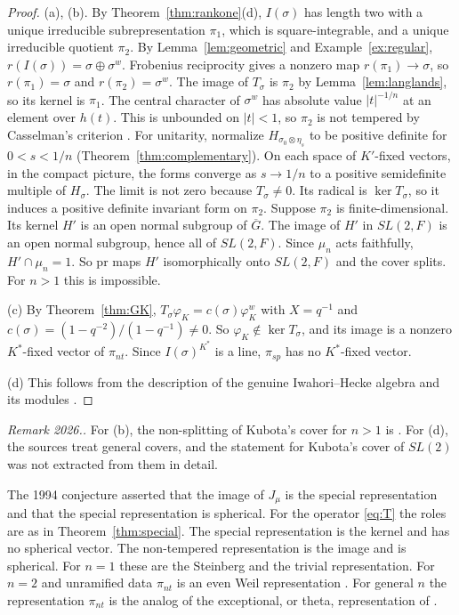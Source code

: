 \documentclass[12pt,letterpaper]{article}
\numberwithin{equation}{section}
\theoremstyle{definition}
\newcounter{rmk}
\newcommand{\unverified}[1]{\refstepcounter{rmk}\par\smallskip\noindent\textit{Remark 2026.\arabic{rmk}.} #1\par\smallskip}
\newcommand{\bG}{\overline{G}}
\newcommand{\pr}{\mathrm{pr}}
\begin{document}
\begin{proof}
(a), (b).  By Theorem~\ref{thm:rankone}(d), $I(\sigma)$ has length two with a unique
irreducible subrepresentation $\pi_1$, which is square-integrable, and a unique irreducible
quotient $\pi_2$.  By Lemma~\ref{lem:geometric} and Example~\ref{ex:regular},
$r(I(\sigma))=\sigma\oplus\sigma^w$.  Frobenius reciprocity gives a nonzero map
$r(\pi_1)\to\sigma$, so $r(\pi_1)=\sigma$ and $r(\pi_2)=\sigma^w$.  The image of $T_\sigma$ is
$\pi_2$ by Lemma~\ref{lem:langlands}, so its kernel is $\pi_1$.  The central character of
$\sigma^w$ has absolute value $|t|^{-1/n}$ at an element over $h(t)$.  This is unbounded on
$|t|<1$, so $\pi_2$ is not tempered by Casselman's criterion \cite{BJ13}.  For
unitarity, normalize $H_{\sigma_0\otimes\eta_s}$ to be positive definite for $0<s<1/n$
(Theorem~\ref{thm:complementary}).  On each space of $K'$-fixed vectors, in the compact
picture, the forms converge as $s\to1/n$ to a positive semidefinite multiple of
$H_\sigma$.  The limit is not zero because $T_\sigma\ne0$.  Its radical is $\ker T_\sigma$, so
it induces a positive definite invariant form on $\pi_2$.  Suppose $\pi_2$ is
finite-dimensional.  Its kernel $H'$ is an open normal subgroup of $\bG$.  The image of
$H'$ in $SL(2,F)$ is an open normal subgroup, hence all of $SL(2,F)$.  Since $\mu_n$ acts
faithfully, $H'\cap\mu_n=1$.  So $\pr$ maps $H'$ isomorphically onto $SL(2,F)$ and the
cover splits.  For $n>1$ this is impossible.

(c) By Theorem~\ref{thm:GK}, $T_\sigma\varphi_K=c(\sigma)\varphi_K^w$ with $X=q^{-1}$ and
$c(\sigma)=(1-q^{-2})/(1-q^{-1})\ne0$.  So $\varphi_K\notin\ker T_\sigma$, and its image is a
nonzero $K^*$-fixed vector of $\pi_{nt}$.  Since $I(\sigma)^{K^*}$ is a line, $\pi_{sp}$ has
no $K^*$-fixed vector.

(d) This follows from the description of the genuine Iwahori--Hecke algebra and its
modules \cite{GGK24}.
\end{proof}
\unverified{For (b), the non-splitting of Kubota's cover for $n>1$ is \cite{Mo68}.  For
(d), the sources treat general covers, and the statement for Kubota's cover of $SL(2)$ was
not extracted from them in detail.}

The 1994 conjecture asserted that the image of $J_\mu$ is the special representation and
that the special representation is spherical.  For the operator \eqref{eq:T} the roles
are as in Theorem~\ref{thm:special}.  The special representation is the kernel and has no
spherical vector.  The non-tempered representation is the image and is spherical.  For
$n=1$ these are the Steinberg and the trivial representation.  For $n=2$ and unramified
data $\pi_{nt}$ is an even Weil representation \cite{Ge76}.  For general $n$ the
representation $\pi_{nt}$ is the analog of the exceptional, or theta, representation of
\cite{KP84}.
\end{document}

